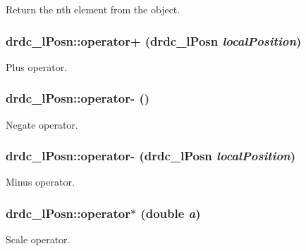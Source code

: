 Return the nth element from the object. 

\hypertarget{classdrdc__lPosn_544e6d8a1487af369ea8846864e11935}{
\subsubsection[operator+]{ drdc\_\-lPosn::operator+ ({\bf drdc\_\-lPosn} {\em localPosition})}}
\label{classdrdc__lPosn_544e6d8a1487af369ea8846864e11935}


Plus operator. 

\hypertarget{classdrdc__lPosn_3d1a980f8ae3cc19e7f30cd29daeab46}{
\subsubsection[operator-]{ drdc\_\-lPosn::operator- ()}}
\label{classdrdc__lPosn_3d1a980f8ae3cc19e7f30cd29daeab46}


Negate operator. 

\hypertarget{classdrdc__lPosn_56edc91463f7140e560a77a26539d5e1}{
\subsubsection[operator-]{ drdc\_\-lPosn::operator- ({\bf drdc\_\-lPosn} {\em localPosition})}}
\label{classdrdc__lPosn_56edc91463f7140e560a77a26539d5e1}


Minus operator. 

\hypertarget{classdrdc__lPosn_0b379c29cf404ffe8ee7f2c927e688c8}{
\subsubsection[operator$\ast$]{ drdc\_\-lPosn::operator$\ast$ (double {\em a})}}
\label{classdrdc__lPosn_0b379c29cf404ffe8ee7f2c927e688c8}


Scale operator. 

